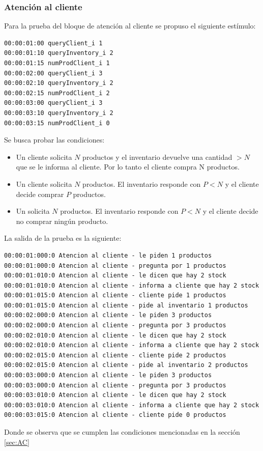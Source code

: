 \documentclass[10pt]{article}
\begin{document}
\subsubsection{Atención al cliente}
Para la prueba del bloque de atención al cliente se propuso el siguiente estímulo:

\centering
\begin{minipage}{1\textwidth}
	\centering
	\begin{lstlisting}
00:00:01:00	queryClient_i 1
00:00:01:10 queryInventory_i 2
00:00:01:15 numProdClient_i 1
00:00:02:00	queryClient_i 3
00:00:02:10 queryInventory_i 2
00:00:02:15 numProdClient_i 2
00:00:03:00	queryClient_i 3
00:00:03:10 queryInventory_i 2
00:00:03:15 numProdClient_i 0
	\end{lstlisting}
\end{minipage}

Se busca probar las condiciones:
\begin{itemize}
	\item Un cliente solicita $N$ productos y el inventario devuelve una cantidad $> N$ que se le informa al cliente. Por lo tanto el cliente compra N productos.
	\item Un cliente solicita $N$ productos. El inventario responde con $P < N$ y el cliente decide comprar $P$ productos.
	\item Un solicita $N$ productos. El inventario responde con $P < N$ y el cliente decide no comprar ningún producto.
\end{itemize}

La salida de la prueba es la siguiente:

\begin{minipage}{1\textwidth}
	\centering
	\begin{lstlisting}
00:00:01:000:0 Atencion al cliente - le piden 1 productos
00:00:01:000:0 Atencion al cliente - pregunta por 1 productos
00:00:01:010:0 Atencion al cliente - le dicen que hay 2 stock
00:00:01:010:0 Atencion al cliente - informa a cliente que hay 2 stock
00:00:01:015:0 Atencion al cliente - cliente pide 1 productos
00:00:01:015:0 Atencion al cliente - pide al inventario 1 productos
00:00:02:000:0 Atencion al cliente - le piden 3 productos
00:00:02:000:0 Atencion al cliente - pregunta por 3 productos
00:00:02:010:0 Atencion al cliente - le dicen que hay 2 stock
00:00:02:010:0 Atencion al cliente - informa a cliente que hay 2 stock
00:00:02:015:0 Atencion al cliente - cliente pide 2 productos
00:00:02:015:0 Atencion al cliente - pide al inventario 2 productos
00:00:03:000:0 Atencion al cliente - le piden 3 productos
00:00:03:000:0 Atencion al cliente - pregunta por 3 productos
00:00:03:010:0 Atencion al cliente - le dicen que hay 2 stock
00:00:03:010:0 Atencion al cliente - informa a cliente que hay 2 stock
00:00:03:015:0 Atencion al cliente - cliente pide 0 productos

	\end{lstlisting}
	
\end{minipage}
Donde se observa que se cumplen las condiciones mencionadas en la sección \ref{sec:AC}
\end{document}
